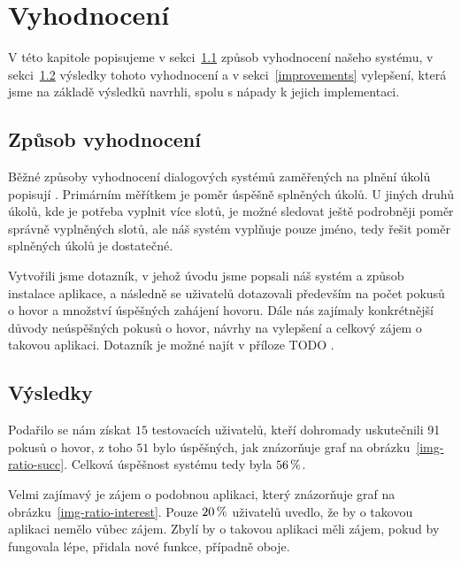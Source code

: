 \chapter{Vyhodnocení}\label{chapter-results}

V této kapitole popisujeme v sekci~\ref{methods} způsob vyhodnocení našeho systému,
v sekci~\ref{results} výsledky tohoto vyhodnocení a v sekci~\ref{improvements}
vylepšení, která jsme na základě výsledků navrhli, spolu s nápady k jejich implementaci.

\section{Způsob vyhodnocení}\label{methods}

Běžné způsoby vyhodnocení dialogových systémů zaměřených na plnění úkolů popisují
\citet[podsekce 24.5.2]{jurafsky_slp_2020}. Primárním měřítkem je poměr úspěšně
splněných úkolů. U jiných druhů úkolů, kde je potřeba vyplnit více slotů, je možné
sledovat ještě podrobněji poměr správně vyplněných slotů, ale náš systém
vyplňuje pouze jméno, tedy řešit poměr splněných úkolů je dostatečné.

Vytvořili jsme dotazník, v jehož úvodu jsme popsali náš systém a způsob instalace
aplikace, a následně se uživatelů dotazovali především na počet pokusů o hovor a
množství úspěšných zahájení hovoru. Dále nás zajímaly konkrétnější důvody neúspěšných
pokusů o hovor, návrhy na vylepšení a celkový zájem o takovou aplikaci. Dotazník je
možné najít v příloze TODO .

\section{Výsledky}\label{results}

Podařilo se nám získat \(15\) testovacích uživatelů, kteří dohromady uskutečnili 91
pokusů o hovor, z toho \(51\) bylo úspěšných, jak znázorňuje
graf na obrázku~\ref{img-ratio-succ}. Celková úspěšnost
systému tedy byla \(56\,\rm \%\).

Velmi zajímavý je zájem o podobnou aplikaci, který znázorňuje graf na obrázku~\ref{img-ratio-interest}.
Pouze \(20\,\rm \%\) uživatelů uvedlo, že by o takovou aplikaci nemělo vůbec zájem.
Zbylí by o takovou aplikaci měli zájem, pokud by fungovala lépe, přidala nové funkce,
případně oboje.


